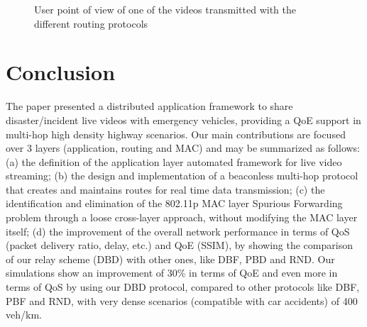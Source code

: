 \documentclass{acm_proc_article-sp}
\begin{document}
\begin{figure}[!t]
\begin{center}
	\caption{User point of view of one of the videos transmitted with the different routing protocols}
	\label{fig:POV}
	\end{center}
\end{figure}




\section{Conclusion}
\label{conclusion}
The paper presented a distributed application framework to share disaster/incident live videos with emergency vehicles, providing a QoE support in multi-hop high density highway scenarios.
Our main contributions are focused over 3 layers (application, routing and MAC) and may be summarized as follows: (a) the definition of the application layer automated framework for live video streaming; (b) the design and implementation of a beaconless multi-hop protocol that creates and maintains routes for real time data transmission; (c) the identification and elimination of the 802.11p MAC layer Spurious Forwarding problem through a loose cross-layer approach, without modifying the MAC layer itself; (d) the improvement of the overall network performance in terms of QoS (packet delivery ratio, delay, etc.) and QoE (SSIM), by showing the comparison of our relay scheme (DBD) with other ones, like DBF, PBD and RND.
Our simulations show an improvement of 30\% in terms of QoE and even more in terms of QoS by using our DBD protocol, compared to other protocols like DBF, PBF and RND, with very dense scenarios (compatible with car accidents) of 400 veh/km.
\end{document}
